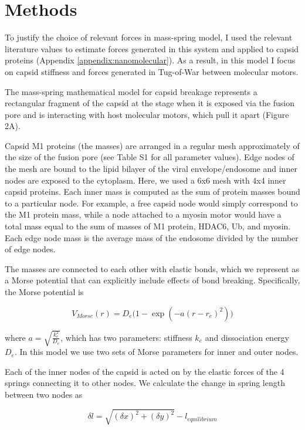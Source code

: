 \section{Methods}

To justify the choice of relevant forces in mass-spring model, I used the relevant literature values to estimate forces generated in this system and applied to capsid proteins (Appendix \ref{appendix:nanomolecular}). As a result, in this model I focus on capsid stiffness and forces generated in Tug-of-War between molecular motors.

The mass-spring mathematical model for capsid breakage represents a rectangular fragment of the capsid at the stage when it is exposed via the fusion pore and is interacting with host molecular motors, which pull it apart (Figure 2A).

Capsid M1 proteins (the masses) are arranged in a regular mesh approximately of the size of the fusion pore (see Table S1 for all parameter values). Edge nodes of the mesh are bound to the lipid bilayer of the viral envelope/endosome and inner nodes are exposed to the cytoplasm. Here, we used a 6x6 mesh with 4x4 inner capsid proteins. Each inner mass is computed as the sum of protein masses bound to a particular node. For example, a free capsid node would simply correspond to the M1 protein mass, while a node attached to a myosin motor would have a total mass equal to the sum of masses of M1 protein, HDAC6, Ub, and myosin. Each edge node mass is the average mass of the endosome divided by the number of edge nodes.

The masses are connected to each other with elastic bonds, which we represent as a Morse potential that can explicitly include effects of bond breaking. Specifically, the Morse potential is

\begin{equation}
V_{Morse} (r) = D_e \big(1 - \exp(-a(r - r_e)^2)\big)
\end{equation}

where  $a = \sqrt{\frac{k^2_e}{D_e}}$, which has two parameters: stiffness $k_e$ and dissociation energy $D_e$. In this model we use two sets of Morse parameters for inner and outer nodes.

Each of the inner nodes of the capsid is acted on by the elastic forces of the 4 springs connecting it to other nodes. We calculate the change in spring length between two nodes as

\begin{equation}
\delta l = \sqrt{(\delta x)^2 + (\delta y)^2} - l_{equilibrium}
\end{equation}

